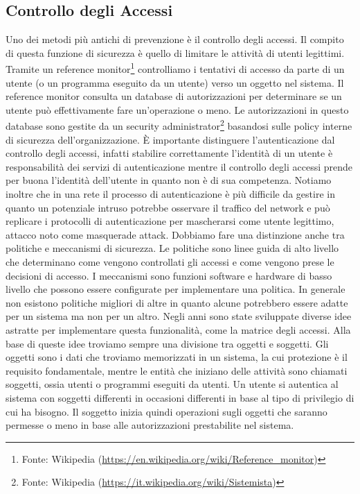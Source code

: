     \subsection{Controllo degli Accessi}
        Uno dei metodi più antichi di prevenzione è il controllo degli accessi. Il compito di questa funzione di sicurezza è quello di limitare le attività di utenti legittimi. Tramite un reference monitor\footnote{Fonte: Wikipedia (\url{https://en.wikipedia.org/wiki/Reference_monitor})} controlliamo i tentativi di accesso da parte di un utente (o un programma eseguito da un utente) verso un oggetto nel sistema. Il reference monitor consulta un database di autorizzazioni per determinare se un utente può effettivamente fare un'operazione o meno. Le autorizzazioni in questo database sono gestite da un security administrator\footnote{Fonte: Wikipedia (\url{https://it.wikipedia.org/wiki/Sistemista})} basandosi sulle policy interne di sicurezza dell'organizzazione. È importante distinguere l'autenticazione dal controllo degli accessi, infatti stabilire correttamente l'identità di un utente è responsabilità dei servizi di autenticazione mentre il controllo degli accessi prende per buona l'identità dell'utente in quanto non è di sua competenza. Notiamo inoltre che in una rete il processo di autenticazione è più difficile da gestire in quanto un potenziale intruso potrebbe osservare il traffico del network e può replicare i protocolli di autenticazione per mascherarsi come utente legittimo, attacco noto come masquerade attack.
        Dobbiamo fare una distinzione anche tra politiche e meccanismi di sicurezza. Le politiche sono linee guida di alto livello che determinano come vengono controllati gli accessi e come vengono prese le decisioni di accesso. I meccanismi sono funzioni software e hardware di basso livello che possono essere configurate per implementare una politica. In generale non esistono politiche migliori di altre in quanto alcune potrebbero essere adatte per un sistema ma non per un altro. Negli anni sono state sviluppate diverse idee astratte per implementare questa funzionalità, come la matrice degli accessi. Alla base di queste idee troviamo sempre una divisione tra oggetti e soggetti. Gli oggetti sono i dati che troviamo memorizzati in un sistema, la cui protezione è il requisito fondamentale, mentre le entità che iniziano delle attività sono chiamati soggetti, ossia utenti o programmi eseguiti da utenti. Un utente si autentica al sistema con soggetti differenti in occasioni differenti in base al tipo di privilegio di cui ha bisogno. Il soggetto inizia quindi operazioni sugli oggetti che saranno permesse o meno in base alle autorizzazioni prestabilite nel sistema.
        
